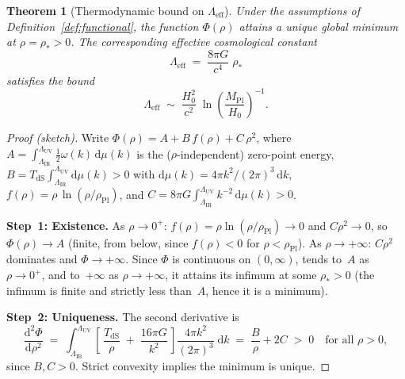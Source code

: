\documentclass[12pt,a4paper]{article}
\theoremstyle{definition}
\theoremstyle{plain}
\newtheorem{theorem}[definition]{Theorem}
\theoremstyle{remark}
\newcommand{\Leff}{\Lambda_{\mathrm{eff}}}
\newcommand{\LUV}{\Lambda_{\mathrm{UV}}}
\newcommand{\LIR}{\Lambda_{\mathrm{IR}}}
\newcommand{\dd}{\mathrm{d}}
\begin{document}
\begin{theorem}[Thermodynamic bound on $\Leff$]\label{thm:main}
Under the assumptions of Definition~\ref{def:functional}, the function
$\Phi(\rho)$ attains a unique global minimum at
$\rho = \rho_{\ast} > 0$. The corresponding effective cosmological
constant
\begin{equation}\label{eq:Leff}
  \Leff \;=\; \frac{8\pi G}{c^{4}}\;\rho_{\ast}
\end{equation}
satisfies the bound
\begin{equation}\label{eq:bound}
  \Leff \;\sim\;
  \frac{H_0^{2}}{c^{2}}\;
  \ln\!\left(\frac{M_{\mathrm{Pl}}}{H_0}\right)^{-1}.
\end{equation}
\end{theorem}

\begin{proof}[Proof (sketch)]
Write $\Phi(\rho) = A + B\,f(\rho) + C\,\rho^{2}$, where
$A = \int_{\LIR}^{\LUV} \tfrac{1}{2}\omega(k)\,\dd\mu(k)$ is the
($\rho$-independent) zero-point energy,
$B = T_{\mathrm{dS}}\int_{\LIR}^{\LUV}\dd\mu(k) > 0$ with
$\dd\mu(k) = 4\pi k^{2}/(2\pi)^{3}\,\dd k$,
$f(\rho) = \rho\,\ln(\rho/\rho_{\mathrm{Pl}})$, and
$C = 8\pi G\int_{\LIR}^{\LUV} k^{-2}\,\dd\mu(k) > 0$.

\medskip\noindent
\textbf{Step~1: Existence.}\;
As $\rho \to 0^{+}$: $f(\rho) = \rho\ln(\rho/\rho_{\mathrm{Pl}}) \to 0$
and $C\rho^{2} \to 0$, so $\Phi(\rho) \to A$ (finite, from below, since
$f(\rho) < 0$ for $\rho < \rho_{\mathrm{Pl}}$).
As $\rho \to +\infty$: $C\rho^{2}$ dominates and $\Phi \to +\infty$.
Since $\Phi$ is continuous on $(0,\infty)$, tends to~$A$ as
$\rho \to 0^+$, and to~$+\infty$ as $\rho \to +\infty$, it attains
its infimum at some $\rho_{\ast} > 0$ (the infimum is finite and
strictly less than~$A$, hence it is a minimum).

\medskip\noindent
\textbf{Step~2: Uniqueness.}\;
The second derivative is
\begin{equation}
  \frac{\dd^{2}\Phi}{\dd\rho^{2}}
  \;=\; \int_{\LIR}^{\LUV}
  \left[\,
    \frac{T_{\mathrm{dS}}}{\rho}
    \;+\; \frac{16\pi G}{k^{2}}
  \,\right]
  \frac{4\pi k^{2}}{(2\pi)^{3}}\;\dd k
  \;=\; \frac{B}{\rho} + 2C
  \;>\; 0
  \quad\text{for all } \rho > 0,
\end{equation}
since $B, C > 0$.  Strict convexity implies the minimum is unique.


\end{proof}
\end{document}
